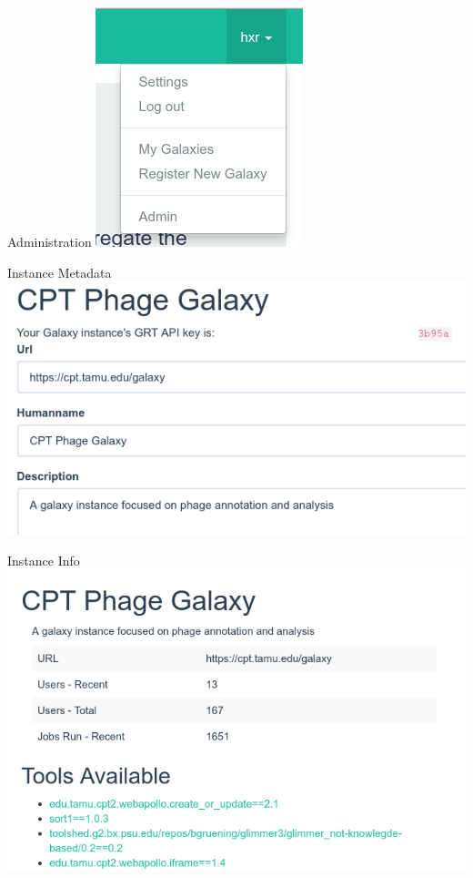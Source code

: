 \documentclass[12pt]{beamer}
\begin{document}
\begin{frame}{Administration}
    \includegraphics[height=.5\textheight]{./img/login-menu.png}
\end{frame}

\begin{frame}{Instance Metadata}
    \includegraphics[width=\textwidth]{./img/instance-admin.png}
\end{frame}

\begin{frame}{Instance Info}
    \includegraphics[width=\textwidth]{./img/instance-info.png}
\end{frame}
\end{document}

